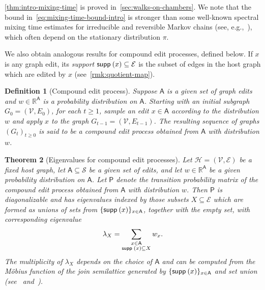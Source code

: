 \documentclass[11pt,a4paper]{article}
\newcommand{\supp}{{\mathsf{supp }\hspace{.075cm}}}
\newtheorem{theorem}{Theorem}[section]
\newtheorem{definition}[theorem]{Definition}
\begin{document}
\cref{thm:intro-mixing-time} is proved in~\cref{sec:walks-on-chambers}. We note that the bound in~\cref{eq:mixing-time-bound-intro} is stronger than some well-known spectral mixing time estimates for irreducible and reversible Markov chains (see, e.g.,~\cite{levin2017markov}), which often depend on the stationary distribution $\pi$.

We also obtain analogous results for compound edit processes, defined below. If $x$ is any graph edit, its \emph{support} $\supp(x)\subseteq\mathcal{E}$ is the subset of edges in the host graph which are edited by $x$ (see~\cref{rmk:quotient-map}).

\begin{definition}[Compound edit process]\label{defn:compound-edit-process}
    Suppose $\mathsf{A}$ is a given set of graph edits and $w\in\mathbb{R}^{\mathsf{A}}$ is a probability distribution on $\mathsf{A}$. Starting with an initial subgraph $G_0 = (\mathcal{V}, E_0)$, for each $t\geq 1$, sample an edit $x\in\mathsf{A}$ according to the distribution $w$ and apply $x$ to the graph $G_{t-1} = (\mathcal{V}, E_{t-1})$. The resulting sequence of graphs $(G_t)_{t\geq 0}$ is said to be a \emph{compound edit process obtained from $\mathsf{A}$ with distribution $w$}. 
\end{definition}

\begin{theorem}[Eigenvalues for compound edit processes]\label{thm:eigenvalues-subsemigroup-intro}
    Let $\mathcal{H}=(\mathcal{V}, \mathcal{E})$ be a fixed host graph, let $\mathsf{A}\subseteq\mathcal{S}$ be a given set of edits, and let $w\in\mathbb{R}^{\mathsf{A}}$ be a given probability distribution on $\mathsf{A}$. Let $\mathsf{P}$ denote the transition probability matrix of the compound edit process obtained from $\mathsf{A}$ with distribution $w$. Then $\mathsf{P}$ is diagonalizable and has eigenvalues indexed by those subsets $X\subseteq\mathcal{E}$ which are formed as unions of sets from $\{\supp(x)\}_{x\in\mathsf{A}}$, together with the empty set, with corresponding eigenvalue
        \begin{align*}
            \lambda_X = \sum_{\substack{x\in\mathsf{A} \\ \supp(x) \subseteq X}} w_x.
        \end{align*}
     The multiplicity of $\lambda_X$ depends on the choice of $\mathsf{A}$ and can be computed from the M\"obius function of the join semilattice generated by $\{\supp(x)\}_{x\in\mathsf{A}}$ and set union (see~\cite[Thm. 1]{brownSemigroupsRingsMarkov2000} and~\cite[Sec. 3.7]{stanley2011enumerative}).
\end{theorem}
\end{document}

